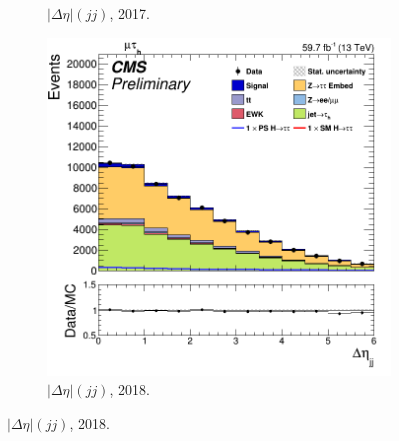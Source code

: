 \begin{figure}
\begin{subfigure}[b]{0.33\linewidth}
    \caption{$|\Delta\eta|(jj)$, 2017.} 
    \vspace{0.5ex}
  \end{subfigure} 
    \begin{subfigure}[b]{0.33\linewidth}
    \centering
    \includegraphics[width=\linewidth]{Chapitre7/Images/CtrlPlots/2018/DijetDeltaEta.png} 
    \caption{$|\Delta\eta|(jj)$, 2018.} 
    \vspace{0.5ex}
  \end{subfigure} 


\end{figure}
